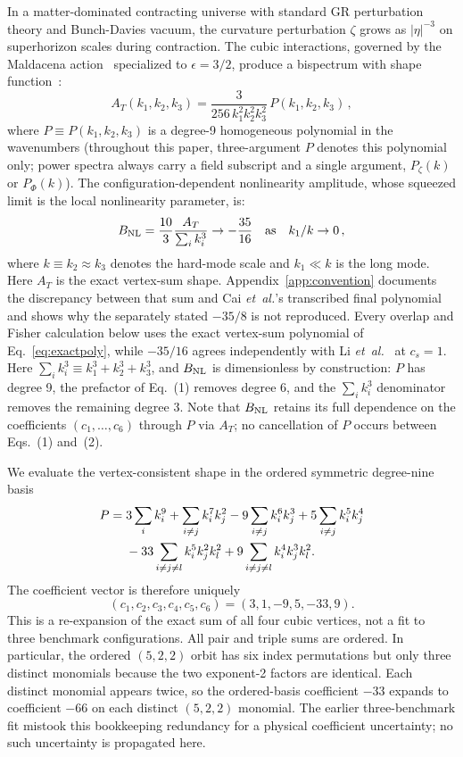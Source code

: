 \documentclass[aps,prd,twocolumn,superscriptaddress,showpacs,preprintnumbers,nofootinbib,longbibliography,floatfix]{revtex4-2}
\newcommand{\BNL}{B_{\rm NL}}
\newcommand{\etal}{\textit{et~al.}}
\begin{document}
In a matter-dominated contracting universe with standard GR perturbation theory and Bunch-Davies vacuum, the curvature perturbation $\zeta$ grows as $|\eta|^{-3}$ on superhorizon scales during contraction. The cubic interactions, governed by the Maldacena action~\cite{Maldacena:2002vr} specialized to $\epsilon = 3/2$, produce a bispectrum with shape function~\cite{Cai:2009fn}:
\begin{equation}
A_T(k_1, k_2, k_3) = \frac{3}{256\, k_1^2 k_2^2 k_3^2}\, P(k_1, k_2, k_3)\,,
\end{equation}
where $P \equiv P(k_1,k_2,k_3)$ is a degree-9 homogeneous polynomial in the wavenumbers (throughout this paper, three-argument $P$ denotes this polynomial only; power spectra always carry a field subscript and a single argument, $P_\zeta(k)$ or $P_\Phi(k)$). The configuration-dependent nonlinearity amplitude, whose squeezed limit is the local nonlinearity parameter, is:
\begin{equation}
\BNL = \frac{10}{3}\frac{A_T}{\sum_i k_i^3} \to -\frac{35}{16}\quad\text{as}\quad k_1/k \to 0\,,
\label{eq:squeezed}
\end{equation}
where $k \equiv k_2 \approx k_3$ denotes the hard-mode scale and $k_1 \ll k$ is the long mode. Here $A_T$ is the exact vertex-sum shape. Appendix~\ref{app:convention} documents the discrepancy between that sum and Cai \etal's transcribed final polynomial and shows why the separately stated $-35/8$ is not reproduced. Every overlap and Fisher calculation below uses the exact vertex-sum polynomial of Eq.~\eqref{eq:exactpoly}, while $-35/16$ agrees independently with Li \etal~\cite{LiQuintin:2017} at $c_s=1$.
Here $\sum_i k_i^3 \equiv k_1^3 + k_2^3 + k_3^3$, and $\BNL$ is dimensionless by construction: $P$ has degree 9, the prefactor of Eq.~(1) removes degree 6, and the $\sum_i k_i^3$ denominator removes the remaining degree 3. Note that $\BNL$ retains its full dependence on the coefficients $(c_1,\ldots,c_6)$ through $P$ via $A_T$; no cancellation of $P$ occurs between Eqs.~(1) and~(2).

We evaluate the vertex-consistent shape in the ordered symmetric degree-nine basis
\begin{align}
P={}&3\sum_i k_i^9+\sum_{i\ne j}k_i^7k_j^2-9\sum_{i\ne j}k_i^6k_j^3
 +5\sum_{i\ne j}k_i^5k_j^4 \notag\\
&-33\sum_{i\ne j\ne l}k_i^5k_j^2k_l^2
 +9\sum_{i\ne j\ne l}k_i^4k_j^3k_l^2 .
\label{eq:exactpoly}
\end{align}
The coefficient vector is therefore uniquely
\begin{equation}
(c_1,c_2,c_3,c_4,c_5,c_6)=(3,1,-9,5,-33,9).
\label{eq:exactcoeff}
\end{equation}
This is a re-expansion of the exact sum of all four cubic vertices, not a fit to three benchmark configurations. All pair and triple sums are ordered. In particular, the ordered $(5,2,2)$ orbit has six index permutations but only three distinct monomials because the two exponent-2 factors are identical. Each distinct monomial appears twice, so the ordered-basis coefficient $-33$ expands to coefficient $-66$ on each distinct $(5,2,2)$ monomial. The earlier three-benchmark fit mistook this bookkeeping redundancy for a physical coefficient uncertainty; no such uncertainty is propagated here.
\end{document}
